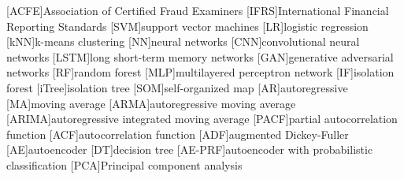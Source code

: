 \begin{acronym}[XXXX]
    [ACFE]{Association of Certified Fraud Examiners}
    [IFRS]{International Financial Reporting Standards}
    [SVM]{support vector machines}
    [LR]{logistic regression}
    [kNN]{k-means clustering}
    [NN]{neural networks}
    [CNN]{convolutional neural networks}
    [LSTM]{long short-term memory networks}
    [GAN]{generative adversarial networks}
    [RF]{random forest}
    [MLP]{multilayered perceptron network}
    [IF]{isolation forest}
    [iTree]{isolation tree}
    [SOM]{self-organized map}
    [AR]{autoregressive}
    [MA]{moving average}
    [ARMA]{autoregressive moving average}
    [ARIMA]{autoregressive integrated moving average}
    [PACF]{partial autocorrelation function}
    [ACF]{autocorrelation function}
    [ADF]{augmented Dickey-Fuller}
    [AE]{autoencoder}
    [DT]{decision tree}
    [AE-PRF]{autoencoder with probabilistic classification}
    [PCA]{Principal component analysis}
\end{acronym}